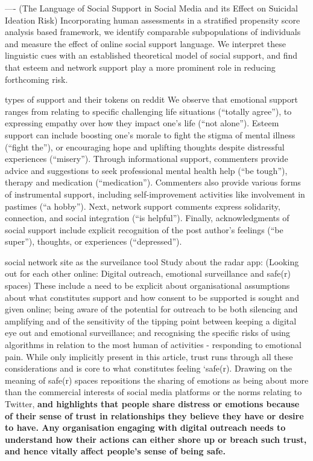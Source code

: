 ----
(The Language of Social Support in Social Media and its Effect on Suicidal Ideation Risk)
Incorporating human assessments in a stratified propensity score analysis based framework, we identify comparable subpopulations of individuals and measure the effect of online social support language. We interpret these linguistic cues with an established theoretical model of social support, and find that esteem and network support play a more prominent role in reducing forthcoming risk. 

types of support and their tokens on reddit 
We observe that emotional support ranges from relating to specific challenging life situations (“totally agree”), to expressing empathy over how they impact one’s life (“not alone”). Esteem support can include boosting one’s morale to fight the stigma of mental illness (“fight the”), or encouraging hope and uplifting thoughts despite distressful experiences (“misery”). Through informational support, commenters provide advice and suggestions to seek professional mental health help (“be tough”), therapy and medication (“medication”). Commenters also provide various forms of instrumental support, including self-improvement activities like involvement in pastimes (“a hobby”). Next, network support comments express solidarity, connection, and social integration (“is helpful”). Finally, acknowledgments of social support include explicit recognition of the post author’s feelings (“be super”), thoughts, or experiences (“depressed”).

social network site as the surveilance tool
Study about the radar app:
(Looking out for each other online: Digital outreach, emotional surveillance and safe(r) spaces)
These include a need to be explicit about organisational assumptions about what constitutes support and how consent to be supported is sought and given online; being aware of the potential for outreach to be both silencing and amplifying and of the sensitivity of the tipping point between keeping a digital eye out and emotional surveillance; and recognising the specific risks of using algorithms in relation to the most human of activities - responding to emotional pain. While only implicitly present in this article, trust runs through all these considerations and is core to what constitutes feeling ‘safe(r). Drawing on the meaning of safe(r) spaces repositions the sharing of emotions as being about more than the commercial interests of social media platforms or the norms relating to Twitter, \textbf{and highlights that people share distress or emotions because of their sense of trust in relationships they believe they have or desire to have. Any organisation engaging with digital outreach needs to understand how their actions can either shore up or breach such trust, and hence vitally affect people's sense of being safe.}



